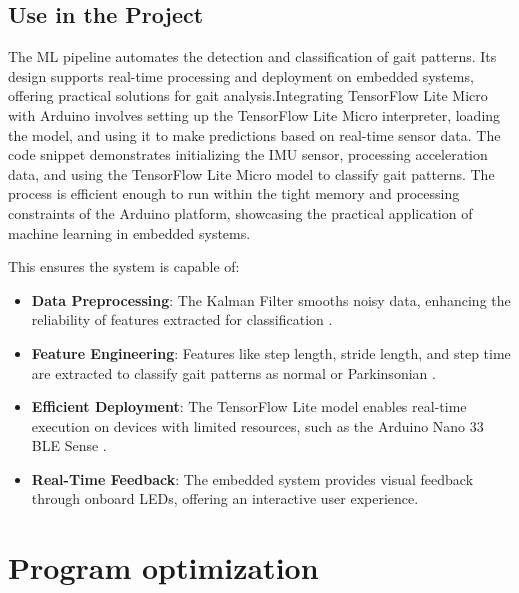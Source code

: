 \subsection{Use in the Project}
The ML pipeline automates the detection and classification of gait patterns. Its design supports real-time processing and deployment on embedded systems, offering practical solutions for gait analysis.Integrating TensorFlow Lite Micro with Arduino involves setting up the TensorFlow Lite Micro interpreter, loading the model, and using it to make predictions based on real-time sensor data. The code snippet demonstrates initializing the IMU sensor, processing acceleration data, and using the TensorFlow Lite Micro model to classify gait patterns. The process is efficient enough to run within the tight memory and processing constraints of the Arduino platform, showcasing the practical application of machine learning in embedded systems.

This ensures the system is capable of:
\begin{itemize}
    \item \textbf{Data Preprocessing}: The Kalman Filter smooths noisy data, enhancing the reliability of features extracted for classification \cite{Kalman:2012}.
    \item \textbf{Feature Engineering}: Features like step length, stride length, and step time are extracted to classify gait patterns as normal or Parkinsonian \cite{Panebianco:2018}.
    \item \textbf{Efficient Deployment}: The TensorFlow Lite model enables real-time execution on devices with limited resources, such as the Arduino Nano 33 BLE Sense \cite{Sulaimon:2021}.
    \item \textbf{Real-Time Feedback}: The embedded system provides visual feedback through onboard LEDs, offering an interactive user experience\cite{ArduinoNano33Sense2025}.
\end{itemize}


\section{Program optimization}
